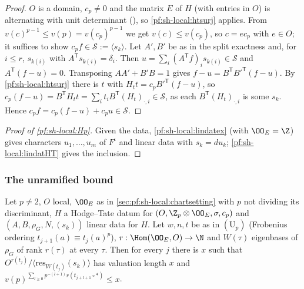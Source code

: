 \begin{proof}
$O$ is a domain, $c_p\ne0$ and the matrix $E$ of $H$ (with entries in $O$) is alternating with unit determinant
(), so \cref{pf:sh-local:htsurj} applies. From $v(c)^{p-1}\le
v(p)=v(c_p)^{p-1}$ we get $v(c)\le v(c_p)$, so $c=ec_p$ with $e\in O$; it suffices to show
$c_pf\in\mathcal S:=\langle s_k\rangle$. Let $A',B'$ be as in the split exactness and, for $i\le r$, $s_{k(i)}$ with
$A^{\mathsf T}s_{k(i)}=\delta_i$. Then $u=\sum_i(A^{\mathsf T}f)_is_{k(i)}\in\mathcal S$ and
$A^{\mathsf T}(f-u)=0$. Transposing $AA'+B'B=1$ gives $f-u=B^{\mathsf T}B'^{\mathsf T}(f-u)$. By
\cref{pf:sh-local:htsurj} there is $t$ with $H_tt=c_pB'^{\mathsf T}(f-u)$, so
$c_p(f-u)=B^{\mathsf T}H_tt=\sum_it_iB^{\mathsf T}(H_t)_{\cdot,i}\in\mathcal S$, as each $B^{\mathsf T}(H_t)_{\cdot,i}$ is
some $s_k$. Hence $c_pf=c_p(f-u)+c_pu\in\mathcal S$.
\end{proof}

\begin{proof}[Proof of \cref{pf:sh-local:Hp}]
Given the data, \cref{pf:sh-local:lindatex} (with $\OO_E=\Z$) gives characters $u_1,\dots,u_m$ of $F^\iota$ and
linear data with $s_k=du_k$; \cref{pf:sh-local:lindatHT} gives the inclusion.
\end{proof}

\subsubsection{The unramified bound}

\begin{proposition}\label{pf:sh-local:lindatU}
Let $p\ne2$, $O$ local, $\OO_E$ as in \cref{sec:pf:sh-local:chartsetting} with $p$ not dividing its discriminant,
$H$ a Hodge--Tate datum for $(O,\Z_p\otimes\OO_E,\sigma,c_p)$ and $(A,B,\rho_G,N,(s_k))$ linear data for $H$. Let
$w,n,t$ be as in $(\mathrm U_p)$ (Frobenius ordering $t_{j+1}(a)\equiv t_j(a)^p$), $r:\Hom(\OO_E,O)\to\N$ and
$W(\tau)$ eigenbases of $\rho_G$ of rank $r(\tau)$ at every $\tau$. Then for every $j$ there is $x$ such that
$O^{r(t_j)}/\langle\mathrm{res}_{W(t_j)}(s_k)\rangle$ has valuation length $x$ and
$v(p)^{\sum_{l\ge0}p^{-(l+1)}r(t_{j+l+1}\circ*)}\le x$.
\end{proposition}

